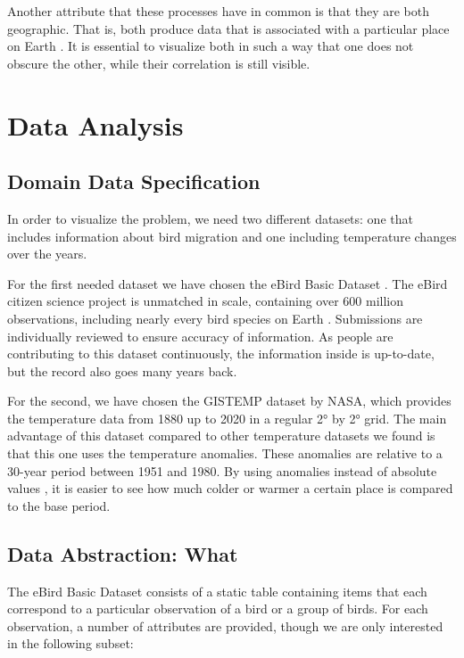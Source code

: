 \documentclass[journal]{vgtc}                %
\begin{document}
Another attribute that these processes have in common is that they are both geographic. That is, both produce data that is associated with a particular place on Earth \cite{iso2014geo}. It is essential to visualize both in such a way that one does not obscure the other, while their correlation is still visible.

\section{Data Analysis}

\subsection{Domain Data Specification}

In order to visualize the problem, we need two different datasets: one that includes information about bird migration and one including temperature changes over the years.

For the first needed dataset we have chosen the eBird Basic Dataset \cite{ebird2020data}. The eBird citizen science project is unmatched in scale, containing over 600 million observations, including nearly every bird species on Earth \cite{strimas2020ebird}. Submissions are individually reviewed to ensure accuracy of information. As people are contributing to this dataset continuously, the information inside is up-to-date, but the record also goes many years back.

For the second, we have chosen the GISTEMP dataset \cite{gistemp} by NASA, which provides the temperature data from 1880 up to 2020 in a regular 2° by 2° grid. The main advantage of this dataset compared to other temperature datasets we found is that this one uses the temperature anomalies. These anomalies are relative to a 30-year period between 1951 and 1980. By using anomalies instead of absolute values \cite{gistempanomalies}, it is easier to see how much colder or warmer a certain place is compared to the base period.

\subsection{Data Abstraction: What}

The eBird Basic Dataset \cite{ebird2020data} consists of a static table containing items that each correspond to a particular observation of a bird or a group of birds. For each observation, a number of attributes are provided, though we are only interested in the following subset:
\end{document}
